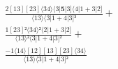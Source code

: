 \documentclass[varwidth, border=5pt]{standalone}
\begin{document}
\begin{my}
$\begin{gathered}
\scriptscriptstyle\frac{2[13][23]⟨34⟩⟨3|𝟓|3]⟨4|1+3|2]}{⟨13⟩⟨3|1+4|3]³} +\\
\scriptscriptstyle\frac{1[23]²⟨34⟩²⟨2|1+3|2]}{⟨13⟩²⟨3|1+4|3]²} +\\
\scriptscriptstyle\frac{-1⟨14⟩[12][13][23]⟨34⟩}{⟨13⟩⟨3|1+4|3]²} \phantom{+}
\end{gathered}$
\end{my}
\end{document}
